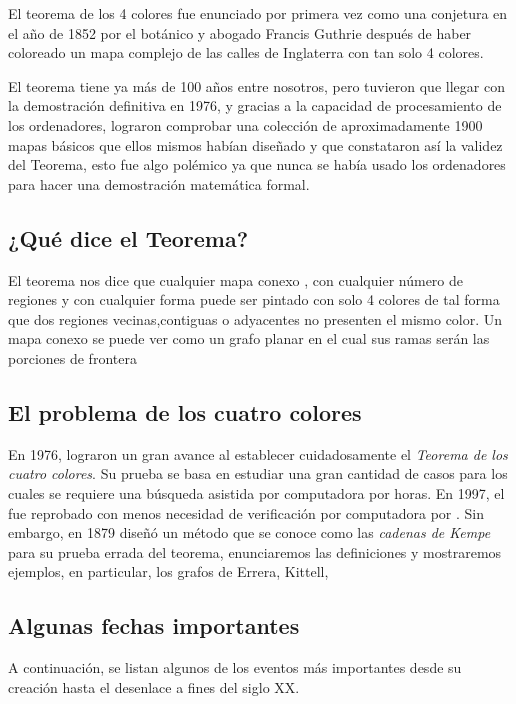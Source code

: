 \documentclass[3p,times,a4paper,twocolumn,authoryear]{elsarticle} %
\begin{document}
El teorema de los 4 colores fue enunciado por primera vez como una conjetura en el año de 1852 por el botánico y abogado Francis Guthrie después de haber coloreado un mapa complejo de las calles de Inglaterra con tan solo 4 colores.

\noindent El teorema tiene ya más de 100 años entre nosotros, pero tuvieron que llegar \citeauthor{appel} con la demostración definitiva en 1976, y gracias a la capacidad de procesamiento de los ordenadores, lograron comprobar una colección de aproximadamente 1900 mapas básicos que ellos mismos habían diseñado y que constataron así la validez del Teorema, esto fue algo polémico ya que nunca se había usado los ordenadores para hacer una demostración matemática formal.

\subsection{¿Qué dice el Teorema?}\label{sec:1.3}
El teorema nos dice que cualquier mapa conexo , con cualquier número de regiones y con cualquier forma puede ser pintado con solo 4 colores de tal forma que dos regiones vecinas,contiguas o adyacentes no presenten el mismo color. Un mapa conexo se puede ver como un grafo planar en el cual sus ramas serán las porciones de frontera

\subsection{El problema de los cuatro colores}\label{sec:1.4}

En 1976, \citeauthor{appel} lograron un gran avance al establecer cuidadosamente el \emph{Teorema de los cuatro colores}. Su prueba se basa en estudiar una gran cantidad de casos para los cuales se requiere una búsqueda asistida por computadora por horas. En 1997, el fue reprobado con menos necesidad de verificación por computadora por \citeauthor{Robin}. Sin embargo, \citeauthor{kempe} en 1879 diseñó un método que se conoce como las \emph{cadenas de Kempe} para su prueba errada del teorema, enunciaremos las definiciones y mostraremos ejemplos, en particular, los grafos de Errera, Kittell, 

\subsection{Algunas fechas importantes}\label{sec:1.5}

A continuación, se listan algunos de los eventos más importantes desde su creación hasta el desenlace a fines del siglo XX.
\end{document}
